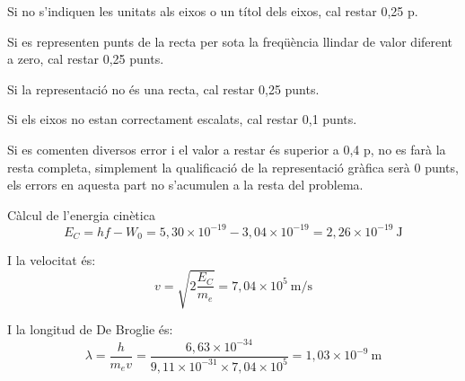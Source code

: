 \begin{solapartat}
 Si no s'indiquen les unitats als eixos o un títol dels eixos, cal restar 0,25 p.

Si es representen punts de la recta per sota la freqüència llindar de valor diferent a zero, cal restar 0,25 punts.

Si la representació no és una recta, cal restar 0,25 punts.

Si els eixos no estan correctament escalats, cal restar 0,1 punts.

Si es comenten diversos error i el valor a restar és superior a 0,4 p, no es farà la resta completa, simplement la qualificació de la representació gràfica serà 0 punts, els errors en aquesta part no s'acumulen a la resta del problema.

\end{solapartat}

\begin{solapartat}
 Càlcul de l'energia cinètica
\[ E_C = hf - W_0 = 5,30\times 10^{-19} - 3,04\times 10^{-19} = 2,26\times 10^{-19}\ \mathrm{J} \]

 I la velocitat és:
\[ v = \sqrt{2\frac{E_C}{m_e}} = 7,04\times 10^{5}\ \mathrm{m/s} \]

 I la longitud de De Broglie és:
\[ \lambda = \frac{h}{m_e v} = \frac{6,63\times 10^{-34}}{9,11\times 10^{-31}\times 7,04\times 10^{5}} = 1,03\times 10^{-9}\ \mathrm{m} \]
\end{solapartat}

